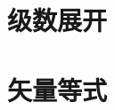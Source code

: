 
\begin{appendices}
    \appendixpage
    \noappendicestocpagenum
    \addappheadtotoc
    
    \chapter{级数展开}
    
    \chapter{矢量等式}

    
\end{appendices}



% 

